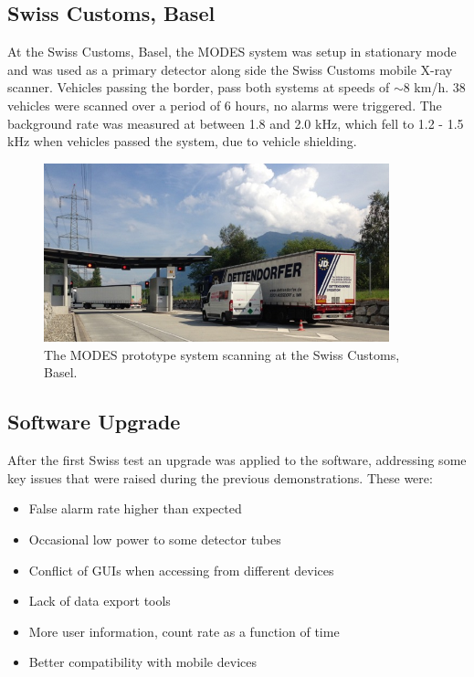 \subsection{Swiss Customs, Basel}
At the Swiss Customs, Basel, the MODES system was setup in stationary mode and was used as a primary detector along side the Swiss Customs mobile X-ray scanner. Vehicles passing the border, pass both systems at speeds of $\sim$8 km/h. 38 vehicles were scanned over a period of 6 hours, no alarms were triggered. The background rate was measured at between 1.8 and 2.0 kHz, which fell to 1.2 - 1.5 kHz when vehicles passed the system, due to vehicle shielding.

\begin{figure}
\begin{center}
\includegraphics[width=100mm]{./Chapter7/figures/swissDemoPic1.jpg}
\end{center}
\caption{The MODES prototype system scanning at the Swiss Customs, Basel.}
\label{fig:swissDemo}
\end{figure}

\subsection{Software Upgrade}
After the first Swiss test an upgrade was applied to the software, addressing some key issues that were raised during the previous demonstrations. These were:

\begin{itemize}
	\item False alarm rate higher than expected
	\item Occasional low power to some detector tubes
	\item Conflict of GUIs when accessing from different devices
	\item Lack of data export tools
	\item More user information, count rate as a function of time
	\item Better compatibility with mobile devices
\end{itemize}


